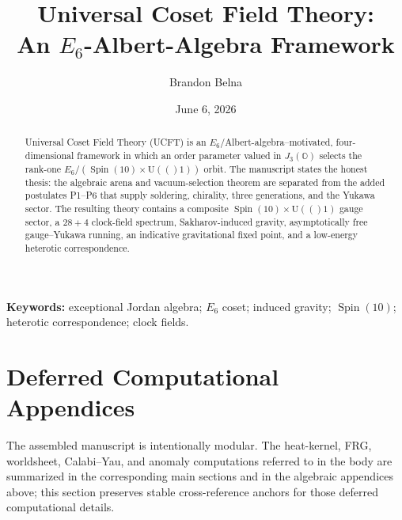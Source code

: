 \documentclass[11pt]{article}
\title{Universal Coset Field Theory:\\
An \(E_{6}\)-Albert-Algebra Framework}
\author{Brandon Belna}
\date{June 6, 2026}
\theoremstyle{plain}
\theoremstyle{definition}
\theoremstyle{remark}
\newcommand{\U}[1]{\mathrm{U}(#1)}
\newcommand{\Spin}{\operatorname{Spin}}
\begin{document}
\maketitle

\begin{abstract}
Universal Coset Field Theory (UCFT) is an $E_6$/Albert-algebra--motivated,
four-dimensional framework in which an order parameter valued in
$J_3(\mathbb O)$ selects the rank-one $E_6/(\Spin(10)\times\U(1))$ orbit.
The manuscript states the honest thesis: the algebraic arena and
vacuum-selection theorem are separated from the added postulates P1--P6 that
supply soldering, chirality, three generations, and the Yukawa sector.
The resulting theory contains a composite $\Spin(10)\times\U(1)$ gauge sector,
a $28+4$ clock-field spectrum, Sakharov-induced gravity, asymptotically free
gauge--Yukawa running, an indicative gravitational fixed point, and a
low-energy heterotic correspondence.
\end{abstract}

\noindent\textbf{Keywords:}
exceptional Jordan algebra; $E_6$ coset; induced gravity; $\Spin(10)$;
heterotic correspondence; clock fields.

\tableofcontents
\clearpage














\appendix





\section{Deferred Computational Appendices}
\label{app:gravity:main}
\label{app:frg}
\label{app:ws:main}
\label{app:cy:main}
\label{app:anomaly:main}
\label{eq:MC}
\label{eq:sigma}
The assembled manuscript is intentionally modular. The heat-kernel, FRG,
worldsheet, Calabi--Yau, and anomaly computations referred to in the body are
summarized in the corresponding main sections and in the algebraic appendices
above; this section preserves stable cross-reference anchors for those deferred
computational details.
\end{document}
